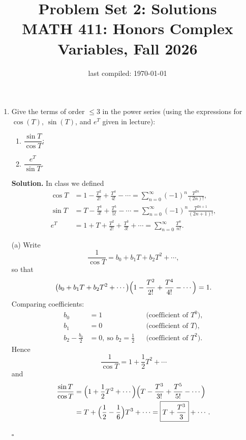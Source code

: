 \documentclass[12pt, reqno]{amsart}
\title{Problem Set 2: Solutions \\ MATH 411: Honors Complex Variables, Fall 2026}
\date{last compiled: \today}
\theoremstyle{definition}
\newenvironment{solution}
  {\par\smallskip\begin{tcolorbox}[breakable, enhanced, colback=solblue, colframe=solframe,
     boxrule=0.5pt, arc=2pt, left=6pt, right=6pt, top=4pt, bottom=4pt]\noindent\textbf{Solution.}}
  {\hfill$\square$\end{tcolorbox}\par\medskip}
\numberwithin{equation}{subsection}
\numberwithin{equation}{section}
\begin{document}
\maketitle


\begin{enumerate}

\item Give the terms of order $\leq 3$ in the power series (using the expressions for $\cos(T)$, $\sin(T)$, and $e^T$ given in lecture):
\begin{enumerate}
\item $\dfrac{\sin T}{\cos T}$;
\item $\dfrac{e^T}{\sin T}$.
\end{enumerate}

\begin{solution}
In class we defined
\begin{align*}
\cos T&=1-\frac{T^2}{2!}+\frac{T^4}{4!}-\cdots=\sum_{n=0}^{\infty}(-1)^n\frac{T^{2n}}{(2n)!},\\
\sin T&=T-\frac{T^3}{3!}+\frac{T^5}{5!}-\cdots=\sum_{n=0}^{\infty}(-1)^n\frac{T^{2n+1}}{(2n+1)!},\\
e^T&=1+T+\frac{T^2}{2!}+\frac{T^3}{3!}+\cdots=\sum_{n=0}^{\infty}\frac{T^n}{n!}.
\end{align*}

\medskip
\noindent (a) Write
\[
\frac{1}{\cos T}=b_0+b_1T+b_2T^2+\cdots,
\]
so that
\[
\bigl(b_0+b_1T+b_2T^2+\cdots\bigr)\Bigl(1-\frac{T^2}{2!}+\frac{T^4}{4!}-\cdots\Bigr)=1 .
\]
Comparing coefficients:
\begin{align*}
b_0&=1 &&\text{(coefficient of $T^0$)},\\
b_1&=0 &&\text{(coefficient of $T$)},\\
b_2-\frac{b_0}{2}&=0,\ \text{so } b_2=\tfrac12 &&\text{(coefficient of $T^2$)}.
\end{align*}
Hence
\[
\frac{1}{\cos T}=1+\frac12T^2+\cdots
\]
and
\begin{align*}
\frac{\sin T}{\cos T}&=\Bigl(1+\frac12T^2+\cdots\Bigr)\Bigl(T-\frac{T^3}{3!}+\frac{T^5}{5!}-\cdots\Bigr)\\
&=T+\Bigl(\frac12-\frac16\Bigr)T^3+\cdots=\boxed{T+\frac{T^3}{3}}+\cdots .
\end{align*}


\end{solution}
\end{enumerate}
\end{document}
